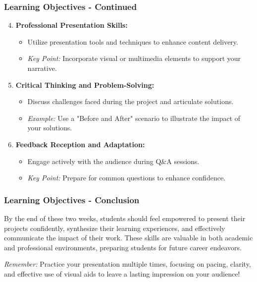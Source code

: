 \documentclass[aspectratio=169]{beamer}
\begin{document}
\begin{frame}[fragile]
    \frametitle{Learning Objectives - Continued}
    \begin{enumerate}
        \setcounter{enumi}{3} %
        \item \textbf{Professional Presentation Skills:}
            \begin{itemize}
                \item Utilize presentation tools and techniques to enhance content delivery.
                \item \textit{Key Point:} Incorporate visual or multimedia elements to support your narrative.
            \end{itemize}
        
        \item \textbf{Critical Thinking and Problem-Solving:}
            \begin{itemize}
                \item Discuss challenges faced during the project and articulate solutions.
                \item \textit{Example:} Use a "Before and After" scenario to illustrate the impact of your solutions.
            \end{itemize}
        
        \item \textbf{Feedback Reception and Adaptation:}
            \begin{itemize}
                \item Engage actively with the audience during Q\&A sessions.
                \item \textit{Key Point:} Prepare for common questions to enhance confidence.
            \end{itemize}
    \end{enumerate}
\end{frame}

\begin{frame}[fragile]
    \frametitle{Learning Objectives - Conclusion}
    By the end of these two weeks, students should feel empowered to present their projects confidently, synthesize their learning experiences, and effectively communicate the impact of their work. These skills are valuable in both academic and professional environments, preparing students for future career endeavors.
    
    \textit{Remember:} Practice your presentation multiple times, focusing on pacing, clarity, and effective use of visual aids to leave a lasting impression on your audience!
\end{frame}
\end{document}

